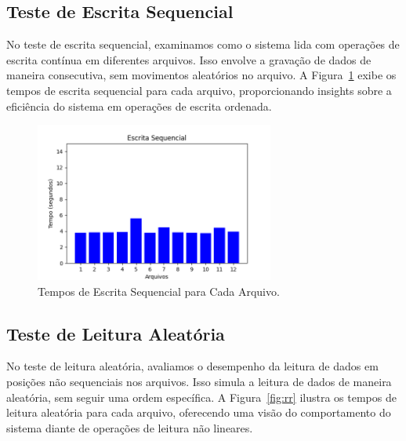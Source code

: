 \documentclass[
	12pt,				%
	openright,			%
	oneside,			%
	a4paper,			%
	chapter=TITLE,		%
	english,			%
	french,				%
	spanish,			%
	brazil				%
	]{abntex2}
\theoremstyle{definition}
\begin{document}

\subsection{Teste de Escrita Sequencial}

No teste de escrita sequencial, examinamos como o sistema lida com operações 
de escrita contínua em diferentes arquivos. Isso envolve a gravação de dados 
de maneira consecutiva, sem movimentos aleatórios no arquivo. 
A Figura~\ref{fig:sw} exibe os tempos de escrita sequencial para cada 
arquivo, proporcionando insights sobre a eficiência do sistema em 
operações de escrita ordenada.

\begin{figure}[H]
    \centering
    \includegraphics[width=0.7\textwidth]{SeqWrite.png}
    \caption{Tempos de Escrita Sequencial para Cada Arquivo.}
    \label{fig:sw}
\end{figure}


\subsection{Teste de Leitura Aleatória}

No teste de leitura aleatória, avaliamos o desempenho da leitura de dados 
em posições não sequenciais nos arquivos. Isso simula a leitura de dados 
de maneira aleatória, sem seguir uma ordem específica. A Figura~\ref{fig:rr} 
ilustra os tempos de leitura aleatória para cada arquivo, oferecendo uma 
visão do comportamento do sistema diante de operações de leitura não lineares.
\end{document}
